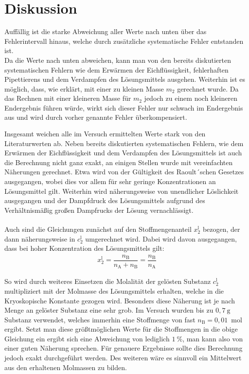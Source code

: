 \documentclass[12pt,a4paper,titlepage,headinclude,bibtotoc]{scrartcl}
\begin{document}
\section{Diskussion}
Auffällig ist die starke Abweichung aller Werte nach unten über das Fehlerintervall hinaus, welche durch zusätzliche systematische Fehler entstanden ist.\\
Da die Werte nach unten abweichen, kann man von den bereits diskutierten systematischen Fehlern wie dem Erwärmen der Eichflüssigkeit, fehlerhaften Pipettierens und dem Verdampfen des Lösungsmittels ausgehen. Weiterhin ist es möglich, dass, wie erklärt, mit einer zu kleinen Masse $m_2$ gerechnet wurde. Da das Rechnen mit einer kleineren Masse für $m_2$ jedoch zu einem noch kleineren Endergebnis führen würde, wirkt sich dieser Fehler nur schwach im Endergebnis aus und wird durch vorher genannte Fehler überkompensiert.     

Insgesamt weichen alle im Versuch ermittelten Werte stark von den Literaturwerten ab. Neben bereits diskutierten systematischen Fehlern, wie dem Erwärmen der Eichflüssigkeit und dem Verdampfen des Lösungsmittels ist auch die Berechnung nicht ganz exakt, an einigen Stellen wurde mit vereinfachten Näherungen gerechnet. Etwa wird von der Gültigkeit des Raoult´schen Gesetzes ausgegangen, wobei dies vor allem für sehr geringe Konzentrationen an Lösungsmittel gilt. Weiterhin wird näherungsweise von unendlicher Löslichkeit ausgegangen und der Dampfdruck des Lösungsmittels aufgrund des Verhältnismäßig großen Dampfrucks der Lösung vernachlässigt.\\\\
Auch sind die Gleichungen zunächst auf den Stoffmengenanteil $x_2^\mathrm{l}$ bezogen, der dann näherungsweise in $c_2^\mathrm{l}$ umgerechnet wird. Dabei wird davon ausgegangen, dass bei hoher Konzentration des Lösungsmittels gilt:
\begin{align}
x_2^\mathrm{l} = \dfrac{n_\mathrm{B}}{n_\mathrm{A} + n_\mathrm{B}} = \dfrac{n_\mathrm{B}}{n_\mathrm{A}}
\end{align}   

So wird durch weiteres Einsetzen die Molalität der gelösten Substanz $c_2^\mathrm{l}$ multipliziert mit der Molmasse des Lösungsmittels erhalten, welche in die Kryoskopische Konstante gezogen wird. Besonders diese Näherung ist je nach Menge an gelöster Substanz eine sehr grob. Im Versuch wurden bis zu $0,7{~}\mathrm{g}$ Substanz verwendet, welches immerhin eine Stoffmenge von fast $n_\mathrm{B} = 0,01${~}mol ergibt. Setzt man diese größtmöglichen Werte für die Stoffmengen in die obige Gleichung ein ergibt sich eine Abweichung von lediglich $1 {~} \% $, man kann also von einer guten Näherung sprechen. Für genauere Ergebnisse sollte dies Berechnung jedoch exakt durchgeführt werden. Des weiteren wäre es sinnvoll ein Mittelwert aus den erhaltenen Molmassen zu bilden.\\\\
  
\end{document}
